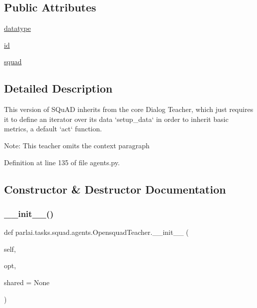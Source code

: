 \subsection*{Public Attributes}
\begin{DoxyCompactItemize}
\item 
\hyperlink{classparlai_1_1tasks_1_1squad_1_1agents_1_1OpensquadTeacher_afcbd95d073286e65923c88490ed03e35}{datatype}
\item 
\hyperlink{classparlai_1_1tasks_1_1squad_1_1agents_1_1OpensquadTeacher_a623ab6df284c53f1266c9a24e95c981b}{id}
\item 
\hyperlink{classparlai_1_1tasks_1_1squad_1_1agents_1_1OpensquadTeacher_af69eaf825785fc1f53f34aa45e5b6c3f}{squad}
\end{DoxyCompactItemize}


\subsection{Detailed Description}
\begin{DoxyVerb}This version of SQuAD inherits from the core Dialog Teacher, which just requires it
to define an iterator over its data `setup_data` in order to inherit basic metrics,
a default `act` function.

Note: This teacher omits the context paragraph
\end{DoxyVerb}
 

Definition at line 135 of file agents.\+py.



\subsection{Constructor \& Destructor Documentation}
\mbox{\label{classparlai_1_1tasks_1_1squad_1_1agents_1_1OpensquadTeacher_a1b05b43517db8f76098f6901d2b7516b}} 
\subsubsection{\texorpdfstring{\+\_\+\+\_\+init\+\_\+\+\_\+()}{\_\_init\_\_()}}
{\footnotesize\ttfamily def parlai.\+tasks.\+squad.\+agents.\+Opensquad\+Teacher.\+\_\+\+\_\+init\+\_\+\+\_\+ (\begin{DoxyParamCaption}\item[{}]{self,  }\item[{}]{opt,  }\item[{}]{shared = {\ttfamily None} }\end{DoxyParamCaption})}



